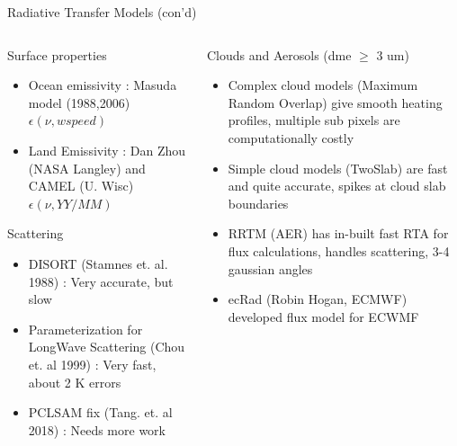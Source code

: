 \documentclass[10pt,t]{beamer}
\begin{document}
\begin{frame}[shrink=2]{Radiative Transfer Models (con'd)}
\vspace{-0.1in}
\begin{columns}

\begin{column}{0.55\columnwidth}
\begin{block}{Surface properties}
  \begin{itemize}
  \item Ocean emissivity : Masuda model (1988,2006) $\epsilon(\nu,wspeed)$
  \item Land Emissivity : Dan Zhou (NASA Langley) and CAMEL (U. Wisc) $\epsilon(\nu,YY/MM)$
  \end{itemize}
\end{block}

\begin{block}{Scattering}
  \begin{itemize}
  \item DISORT (Stamnes et. al. 1988) : Very accurate, but slow
  \item Parameterization for LongWave Scattering (Chou et. al 1999) : Very fast, about 2 K errors
  \item PCLSAM fix (Tang. et. al 2018) : Needs more work
  \end{itemize}
\end{block}
\end{column}

\begin{column}{0.55\columnwidth}
\begin{block}{Clouds and Aerosols (dme $\ge$ 3 um)}
  \begin{itemize}
  \item Complex cloud models (Maximum Random Overlap) give smooth heating profiles, multiple sub pixels are computationally costly
  \item Simple cloud models (TwoSlab) are fast and quite accurate, spikes at cloud slab boundaries
  \item RRTM (AER) has in-built fast RTA for flux calculations, handles scattering, 3-4 gaussian angles
  \item ecRad (Robin Hogan, ECMWF) developed flux model for ECWMF
  \end{itemize}
\end{block}
\end{column}
\end{columns}
\end{frame}
\end{document}
